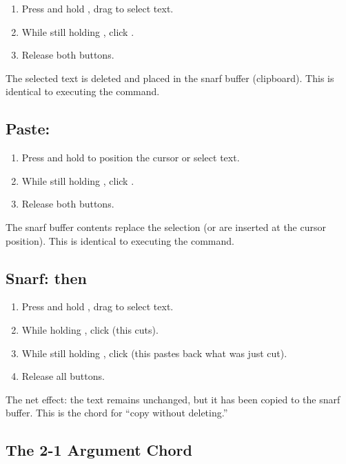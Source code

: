 \begin{enumerate}
\item Press and hold , drag to select text.
\item While still holding , click .
\item Release both buttons.
\end{enumerate}

The selected text is deleted and placed in the snarf buffer (clipboard).
This is identical to executing the  command.

\subsection{Paste: }

\begin{enumerate}
\item Press and hold  to position the cursor or select text.
\item While still holding , click .
\item Release both buttons.
\end{enumerate}

The snarf buffer contents replace the selection (or are inserted at the
cursor position).  This is identical to executing the 
command.

\subsection{Snarf:  then }

\begin{enumerate}
\item Press and hold , drag to select text.
\item While holding , click  (this cuts).
\item While still holding , click  (this pastes
      back what was just cut).
\item Release all buttons.
\end{enumerate}

The net effect: the text remains unchanged, but it has been copied to
the snarf buffer.  This is the chord for ``copy without deleting.''

\subsection{The 2-1 Argument Chord}

